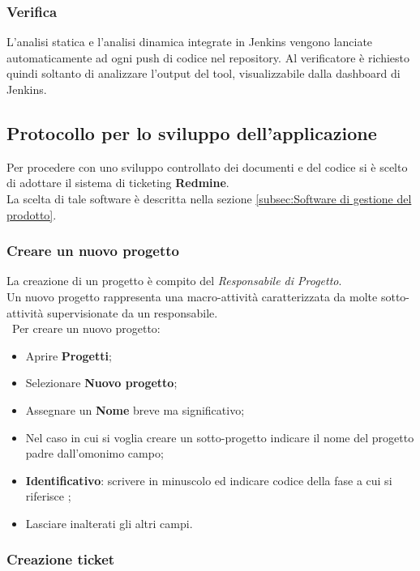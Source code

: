 \subsubsection{Verifica}
L’analisi statica e l’analisi dinamica integrate in Jenkins vengono lanciate automaticamente ad ogni push di codice nel repository. Al verificatore è richiesto quindi soltanto di analizzare l’output del tool, visualizzabile dalla dashboard di Jenkins.




\subsection{Protocollo per lo sviluppo dell'applicazione} 
Per procedere con uno sviluppo controllato dei documenti e del codice si è scelto di adottare il sistema di ticketing \textbf{Redmine}.\\ 
La scelta di tale software è descritta nella sezione \ref{subsec:Software di gestione del prodotto}.

\subsubsection{Creare un nuovo progetto} 

La creazione di un progetto è compito del \emph{Responsabile di Progetto}.\\ 
Un nuovo progetto rappresenta una macro-attività caratterizzata da molte sotto-attività supervisionate da un responsabile.\\\
Per creare un nuovo progetto:
\begin{itemize}
\item Aprire \textbf{Progetti}; 
\item Selezionare \textbf{Nuovo progetto}; 
\item Assegnare un \textbf{Nome} breve ma significativo; 
\item Nel caso in cui si voglia creare un sotto-progetto indicare il nome del progetto padre dall’omonimo campo; 
\item \textbf{Identificativo}: scrivere in minuscolo ed indicare codice\ped{g} della fase a cui si riferisce ;
\item Lasciare inalterati gli altri campi. 
\end{itemize}
 
\subsubsection{Creazione ticket}
 
